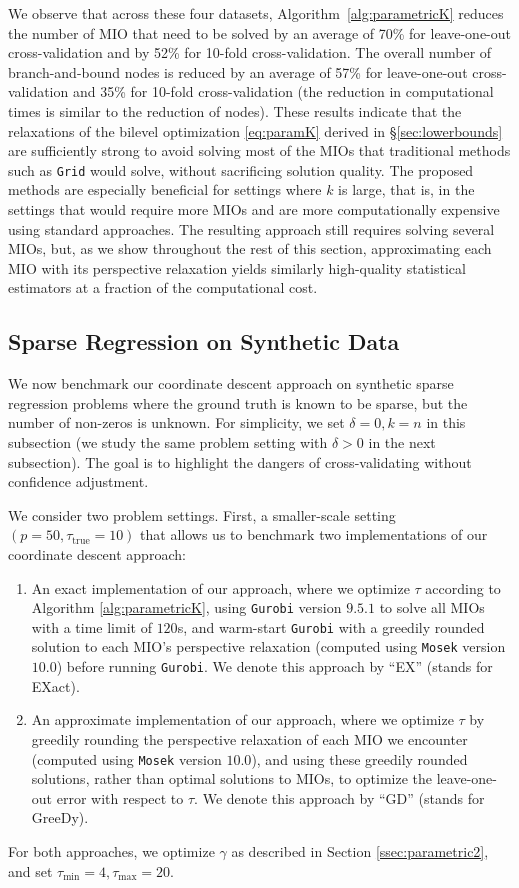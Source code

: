 \documentclass[mnsc,nonblindrev]{informs3} %
\begin{document}
We observe that across these four datasets, Algorithm~\ref{alg:parametricK} reduces the number of MIO that need to be solved by an average of 70\% for leave-one-out cross-validation and by 52\% for 10-fold cross-validation. The overall number of branch-and-bound nodes is reduced by an average of 57\% for leave-one-out cross-validation and 35\% for 10-fold cross-validation (the reduction in computational times is similar to the reduction of nodes). These results indicate that the relaxations of the bilevel optimization \eqref{eq:paramK} derived in \S\ref{sec:lowerbounds} are sufficiently strong to avoid solving most of the MIOs that traditional methods such as \texttt{Grid} would solve, without sacrificing solution quality. The proposed methods are especially beneficial for settings where $k$ is large, that is, in the settings that would require more MIOs and are more computationally expensive using standard approaches. The resulting approach still requires solving several MIOs, but, as we show throughout the rest of this section, approximating each MIO with its perspective relaxation yields similarly high-quality statistical estimators at a fraction of the computational cost.

\subsection{Sparse Regression on Synthetic Data}\label{sec:syntStats1}
We now benchmark our coordinate descent approach on synthetic sparse regression problems where the ground truth is known to be sparse, but the number of non-zeros is unknown. For simplicity, we set $\delta=0, k=n$ in this subsection (we study the same problem setting with $\delta>0$ in the next subsection). The goal is to highlight the dangers of cross-validating without confidence adjustment. 

We consider two problem settings. First, a smaller-scale setting $(p=50, \tau_{\text{true}}=10)$ that allows us to benchmark two implementations of our coordinate descent approach: 
\begin{enumerate}
    \item An exact implementation of our approach, where we optimize $\tau$ according to Algorithm \ref{alg:parametricK}, using \verb|Gurobi| version $9.5.1$ to solve all MIOs with a time limit of $120$s, and warm-start \verb|Gurobi| with a greedily rounded solution to each MIO's perspective relaxation (computed using \verb|Mosek| version $10.0$) before running \verb|Gurobi|. We denote this approach by ``EX'' (stands for EXact).
    \item An approximate implementation of our approach, where we optimize $\tau$ by greedily rounding the perspective relaxation of each MIO we encounter (computed using \verb|Mosek| version $10.0$), and using these greedily rounded solutions, rather than optimal solutions to MIOs, to optimize the leave-one-out error with respect to $\tau$. We denote this approach by ``GD'' (stands for GreeDy).
\end{enumerate}
For both approaches, we optimize $\gamma$ as described in Section \ref{ssec:parametric2}, and set $\tau_{\min}=4, \tau_{\max}=20$.
\end{document}
